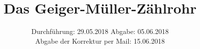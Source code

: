 

\subject{Versuch 703}
\title{Das Geiger-Müller-Zählrohr}
\date{
  Durchführung: 29.05.2018
  \hspace{3em}
  Abgabe: 05.06.2018\\
  Abgabe der Korrektur per Mail: 15.06.2018
}


      \maketitle
      \thispagestyle{empty}
      \tableofcontents
      \newpage
      
      
      
      \newpage
      
      
      
      \printbibliography{}
      

